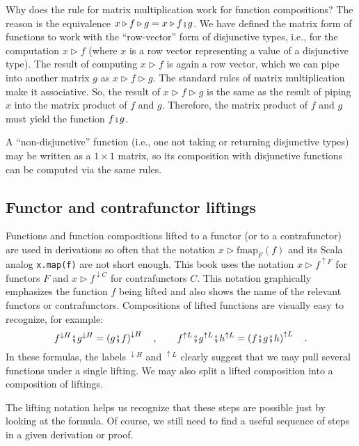 Why does the rule for matrix multiplication work for function compositions?
The reason is the equivalence $x\triangleright f\triangleright g=x\triangleright f\bef g$.
We have defined the matrix form of functions to work with the \textsf{``}row-vector\textsf{''}
form of disjunctive types, i.e., for the computation $x\triangleright f$
(where $x$ is a row vector representing a value of a disjunctive
type). The result of computing $x\triangleright f$ is again a row
vector, which we can pipe into another matrix $g$ as $x\triangleright f\triangleright g$.
The standard rules of matrix multiplication make it associative. So,
the result of $x\triangleright f\triangleright g$ is the same as
the result of piping $x$ into the matrix product of $f$ and $g$.
Therefore, the matrix product of $f$ and $g$ must yield the function
$f\bef g$.

A \textsf{``}non-disjunctive\textsf{''} function (i.e., one not taking or returning
disjunctive types) may be written as a $1\times1$ matrix, so its
composition with disjunctive functions can be computed via the same
rules. 

\subsection{Functor and contrafunctor liftings}

Functions and function compositions lifted to a functor (or to a contrafunctor)
are used in derivations so often that the notation $x\triangleright\text{fmap}_{F}(f)$
and its Scala analog \lstinline!x.map(f)! are not short enough. This
book uses the notation $x\triangleright f^{\uparrow F}$ for functors
$F$ and $x\triangleright f^{\downarrow C}$ for contrafunctors $C$.
This notation graphically emphasizes the function $f$ being lifted
and also shows the name of the relevant functors or contrafunctors.
Compositions of lifted functions are visually easy to recognize, for
example:
\[
f^{\downarrow H}\bef g^{\downarrow H}=\left(g\bef f\right)^{\downarrow H}\quad,\quad\quad f^{\uparrow L}\bef g^{\uparrow L}\bef h^{\uparrow L}=\left(f\bef g\bef h\right)^{\uparrow L}\quad.
\]
In these formulas, the labels $^{\downarrow H}$ and $^{\uparrow L}$
clearly suggest that we may pull several functions under a single
lifting. We may also split a lifted composition into a composition
of liftings. 

The lifting notation helps us recognize that these steps are possible
just by looking at the formula. Of course, we still need to find a
useful sequence of steps in a given derivation or proof.

